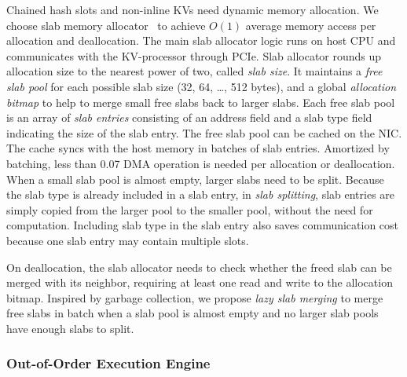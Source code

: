 Chained hash slots and non-inline KVs need dynamic memory allocation.
We choose slab memory allocator~\cite{bonwick1994slab} to achieve $O(1)$ average memory access per allocation and deallocation. The main slab allocator logic runs on host CPU and communicates with the KV-processor through PCIe.
Slab allocator rounds up allocation size to the nearest power of two, called \textit{slab size}.
It maintains a \textit{free slab pool} for each possible slab size (32, 64, \ldots, 512 bytes), and a global \textit{allocation bitmap} to help to merge small free slabs back to larger slabs.
Each free slab pool is an array of \textit{slab entries} consisting of an address field and a slab type field indicating the size of the slab entry.
The free slab pool can be cached on the NIC. The cache syncs with the host memory in batches of slab entries. Amortized by batching, less than 0.07 DMA operation is needed per allocation or deallocation.
When a small slab pool is almost empty, larger slabs need to be split.
Because the slab type is already included in a slab entry, in \textit{slab splitting}, slab entries are simply copied from the larger pool to the smaller pool, without the need for computation.
Including slab type in the slab entry also saves communication cost because one slab entry may contain multiple slots.

On deallocation, the slab allocator needs to check whether the freed slab can be merged with its neighbor, requiring at least one read and write to the allocation bitmap.
Inspired by garbage collection, we propose \textit{lazy slab merging} to merge free slabs in batch when a slab pool is almost empty and no larger slab pools have enough slabs to split.

\subsubsection{Out-of-Order Execution Engine}
\label{kvdirect:sec:ooo}
%
%

